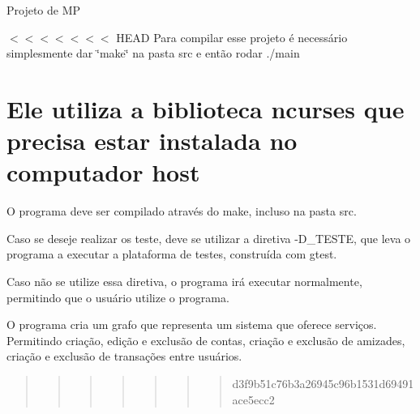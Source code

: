 Projeto de MP

$<$$<$$<$$<$$<$$<$$<$ H\+E\+AD Para compilar esse projeto é necessário simplesmente dar \char`\"{}make\char`\"{} na pasta src e então rodar ./main

\section*{Ele utiliza a biblioteca ncurses que precisa estar instalada no computador host }

O programa deve ser compilado através do make, incluso na pasta src.

Caso se deseje realizar os teste, deve se utilizar a diretiva -\/\+D\+\_\+\+T\+E\+S\+TE, que leva o programa a executar a plataforma de testes, construída com gtest.

Caso não se utilize essa diretiva, o programa irá executar normalmente, permitindo que o usuário utilize o programa.

O programa cria um grafo que representa um sistema que oferece serviços. Permitindo criação, edição e exclusão de contas, criação e exclusão de amizades, criação e exclusão de transações entre usuários. \begin{quote}
\begin{quote}
\begin{quote}
\begin{quote}
\begin{quote}
\begin{quote}
\begin{quote}
d3f9b51c76b3a26945c96b1531d69491ace5ecc2\end{quote}
\end{quote}
\end{quote}
\end{quote}
\end{quote}
\end{quote}
\end{quote}
